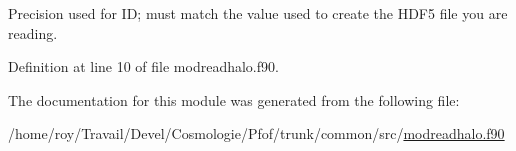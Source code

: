Precision used for I\-D; must match the value used to create the H\-D\-F5 file you are reading. 



Definition at line 10 of file modreadhalo.\-f90.



The documentation for this module was generated from the following file\-:\begin{DoxyCompactItemize}
\item 
/home/roy/\-Travail/\-Devel/\-Cosmologie/\-Pfof/trunk/common/src/\hyperlink{modreadhalo_8f90}{modreadhalo.\-f90}\end{DoxyCompactItemize}
